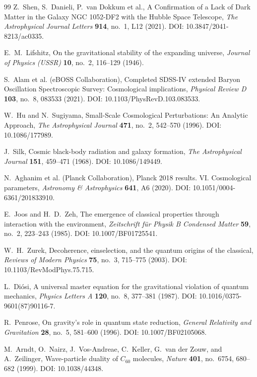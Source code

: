\documentclass[11pt,a4paper]{article}
\theoremstyle{definition}
\begin{document}
\begin{thebibliography}{99}
Z.~Shen, S.~Danieli, P.~van Dokkum et al., A Confirmation of a Lack of Dark Matter in the Galaxy NGC 1052-DF2 with the Hubble Space Telescope, \textit{The Astrophysical Journal Letters} \textbf{914}, no.~1, L12 (2021). DOI: 10.3847/2041-8213/ac0335.

E.~M.~Lifshitz, On the gravitational stability of the expanding universe, \textit{Journal of Physics (USSR)} \textbf{10}, no.~2, 116--129 (1946).

S.~Alam et al. (eBOSS Collaboration), Completed SDSS-IV extended Baryon Oscillation Spectroscopic Survey: Cosmological implications, \textit{Physical Review D} \textbf{103}, no.~8, 083533 (2021). DOI: 10.1103/PhysRevD.103.083533.

W.~Hu and N.~Sugiyama, Small-Scale Cosmological Perturbations: An Analytic Approach, \textit{The Astrophysical Journal} \textbf{471}, no.~2, 542--570 (1996). DOI: 10.1086/177989.

J.~Silk, Cosmic black-body radiation and galaxy formation, \textit{The Astrophysical Journal} \textbf{151}, 459--471 (1968). DOI: 10.1086/149449.

N.~Aghanim et al. (Planck Collaboration), Planck 2018 results. VI. Cosmological parameters, \textit{Astronomy \& Astrophysics} \textbf{641}, A6 (2020). DOI: 10.1051/0004-6361/201833910.

E.~Joos and H.~D.~Zeh, The emergence of classical properties through interaction with the environment, \textit{Zeitschrift f\"ur Physik B Condensed Matter} \textbf{59}, no.~2, 223--243 (1985). DOI: 10.1007/BF01725541.

W.~H.~Zurek, Decoherence, einselection, and the quantum origins of the classical, \textit{Reviews of Modern Physics} \textbf{75}, no.~3, 715--775 (2003). DOI: 10.1103/RevModPhys.75.715.

L.~Di\'osi, A universal master equation for the gravitational violation of quantum mechanics, \textit{Physics Letters A} \textbf{120}, no.~8, 377--381 (1987). DOI: 10.1016/0375-9601(87)90116-7.

R.~Penrose, On gravity's role in quantum state reduction, \textit{General Relativity and Gravitation} \textbf{28}, no.~5, 581--600 (1996). DOI: 10.1007/BF02105068.

M.~Arndt, O.~Nairz, J.~Vos-Andreae, C.~Keller, G.~van der Zouw, and A.~Zeilinger, Wave-particle duality of $C_{60}$ molecules, \textit{Nature} \textbf{401}, no.~6754, 680--682 (1999). DOI: 10.1038/44348.


\end{thebibliography}
\end{document}
